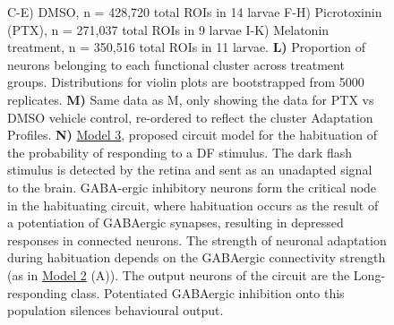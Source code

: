 \documentclass[9pt,lineno]{RandlettLab_elife}
\begin{document}
\begin{figure}
\begin{fullwidth}
\begin{center}
{C-E) DMSO, n = 428,720 total ROIs in 14 larvae F-H) Picrotoxinin (PTX), n = 271,037 total ROIs in 9 larvae I-K) Melatonin treatment, n = 350,516 total ROIs in 11 larvae.
\textbf{L)} Proportion of neurons belonging to each functional cluster across treatment groups. Distributions for violin plots are bootstrapped from 5000 replicates. 
\textbf{M)} Same data as M, only showing the data for PTX vs DMSO vehicle control, re-ordered to reflect the cluster Adaptation Profiles. 
\textbf{N)} \underline{Model 3}, proposed circuit model for the habituation of the probability of responding to a DF stimulus. The dark flash stimulus is detected by the retina and sent as an unadapted signal to the brain. GABA-ergic inhibitory neurons form the critical node in the habituating circuit, where habituation occurs as the result of a potentiation of GABAergic synapses, resulting in depressed responses in connected neurons. The strength of neuronal adaptation during habituation depends on the GABAergic connectivity strength (as in  \underline{Model 2} (A)). The output neurons of the circuit are the Long-responding class. Potentiated GABAergic inhibition onto this population silences behavioural output. 
}
\label{fig:8}

\end{center}
\end{fullwidth}
\end{figure}
\end{document}
